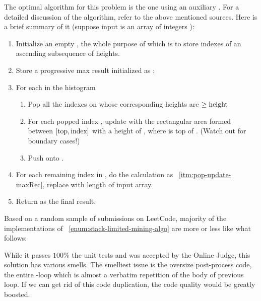 The optimal algorithm for this problem is the one using an auxiliary .
For a detailed discussion of the algorithm, refer to the above mentioned sources.
Here is a brief summary of it (suppose input is an array of integers ):
\begin{alisting}[H]
    \caption{\label{enum:stack-limited-mining-algo}Stack-based algorithm for
    the `maximum rectangular area under histogram' problem}
    \begin{enumerate}
        \item Initialize an empty , the whole purpose of
        which is to store indexes of an ascending subsequence of heights.
        \item Store a progressive max result initialized as ;
        \item For each  in the histogram
        \begin{enumerate}
            \item Pop all the indexes on  whose corresponding heights are
            $\geq \mbox{\code{height}}$
            \item For each popped index , update  with the
            rectangular area formed between $[\mbox{\code{top}}, \mbox{\code{index}}]$
            with a height of , where  is top of .
            (Watch out for boundary cases!) \label{itm:pop-update-maxRec}
            \item Push  onto .
        \end{enumerate}
        \item For each remaining index in , do the calculation
        as ~\ref{itm:pop-update-maxRec}, replace  with length of input array.
        \item Return  as the final result.
    \end{enumerate}
\end{alisting}


Based on a random sample of submissions on LeetCode, majority of the implementations
of ~\autoref{enum:stack-limited-mining-algo} are more or less like what follows:

While it passes $100\%$ the unit tests and was accepted by the Online Judge, this
solution has various smells.
The smelliest issue is the oversize post-process code, the entire -loop which
is almost a verbatim repetition of the body of previous loop.
If we can get rid of this code duplication, the code quality would be greatly boosted.


